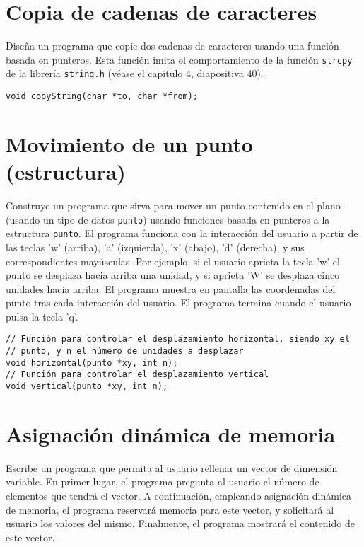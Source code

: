 \documentclass[a4paper]{article}
\begin{document}
\section{Copia de cadenas de caracteres}
\label{sec:org5d53a49}

Diseña un programa que copie dos cadenas de caracteres usando una función basada en punteros. Esta función imita el comportamiento de la función \texttt{strcpy} de la librería \texttt{string.h} (véase el capítulo 4, diapositiva 40).

\lstset{language=C,label= ,caption= ,captionpos=b,numbers=none}
\begin{lstlisting}
void copyString(char *to, char *from);
\end{lstlisting}

\section{Movimiento de un punto (estructura)}
\label{sec:org6710acc}

Construye un programa que sirva para mover un punto contenido en el plano (usando un tipo de datos \texttt{punto}) usando funciones basada en punteros a la estructura \texttt{punto}. El programa funciona con la interacción del usuario a partir de las teclas 'w' (arriba), 'a' (izquierda), 'x' (abajo), 'd' (derecha), y sus correspondientes mayúsculas. Por ejemplo, si el usuario aprieta la tecla 'w' el punto se desplaza hacia arriba una unidad, y si aprieta 'W' se desplaza cinco unidades hacia arriba. El programa muestra en pantalla las coordenadas del punto tras cada interacción del usuario.
El programa termina cuando el usuario pulsa la tecla 'q'.

\lstset{language=C,label= ,caption= ,captionpos=b,numbers=none}
\begin{lstlisting}
// Función para controlar el desplazamiento horizontal, siendo xy el
// punto, y n el número de unidades a desplazar
void horizontal(punto *xy, int n);
// Función para controlar el desplazamiento vertical
void vertical(punto *xy, int n);
\end{lstlisting}

\section{Asignación dinámica de memoria}
\label{sec:org44a6b01}
Escribe un programa que permita al usuario rellenar un vector de dimensión variable. En primer lugar, el programa pregunta al usuario el número de elementos que tendrá el vector. A continuación, empleando asignación dinámica de memoria, el programa reservará memoria para este vector, y solicitará al usuario los valores del mismo. Finalmente, el programa mostrará el contenido de este vector.
\end{document}
